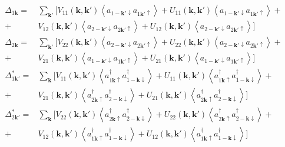\documentclass[class=article, crop=false]{standalone}
\begin{document}
\begin{equation}\label{key}
	\begin{split}
		\Delta_{ 1 \mathbf{k}} = & \sum_{ \mathbf{k}'} [ V_{ 1 1} ( \mathbf{k}, \mathbf{k}') \left\langle a_{ 1 -\mathbf{k}' \downarrow} a_{ 1 \mathbf{k}' \uparrow} \right\rangle + U_{ 1 1} ( \mathbf{k}, \mathbf{k}') \left\langle a_{ 1 -\mathbf{k}' \downarrow} a_{ 1 \mathbf{k}' \uparrow} \right\rangle + \\
		+ & V_{ 1 2} ( \mathbf{k}, \mathbf{k}') \left\langle a_{ 2 -\mathbf{k}' \downarrow} a_{ 2 \mathbf{k}' \uparrow} \right\rangle + U_{ 1 2} ( \mathbf{k}, \mathbf{k}') \left\langle a_{ 2 -\mathbf{k}' \downarrow} a_{ 2 \mathbf{k}' \uparrow} \right\rangle ]\\
		\Delta_{ 2 \mathbf{k}} = & \sum_{ \mathbf{k}'} [ V_{ 2 2} ( \mathbf{k}, \mathbf{k}') \left\langle a_{ 2 -\mathbf{k}' \downarrow} a_{ 2 \mathbf{k}' \uparrow} \right\rangle  + U_{ 2 2} ( \mathbf{k}, \mathbf{k}') \left\langle a_{ 2 -\mathbf{k}' \downarrow} a_{ 2 \mathbf{k}' \uparrow} \right\rangle + \\
		+ & V_{ 2 1} ( \mathbf{k}, \mathbf{k}') \left\langle a_{ 1 -\mathbf{k}' \downarrow} a_{ 1 \mathbf{k}' \uparrow} \right\rangle + U_{ 2 1} ( \mathbf{k}, \mathbf{k}') \left\langle a_{ 1 -\mathbf{k}' \downarrow} a_{ 1 \mathbf{k}' \uparrow} \right\rangle ] \\
		\Delta_{ 1 \mathbf{k}'}^{ \ast} = & \sum_{ \mathbf{k}} [ V_{ 1 1} ( \mathbf{k}, \mathbf{k}') \left\langle a^{ \dagger}_{ 1 \mathbf{k} \uparrow} a^{ \dagger}_{ 1 -\mathbf{k} \downarrow} \right\rangle + U_{ 1 1} ( \mathbf{k}, \mathbf{k}') \left\langle a^{ \dagger}_{ 1 \mathbf{k} \uparrow} a^{ \dagger}_{ 1 -\mathbf{k} \downarrow} \right\rangle + \\
		+ & V_{ 2 1} ( \mathbf{k}, \mathbf{k}') \left\langle a^{ \dagger}_{ 2 \mathbf{k} \uparrow} a^{ \dagger}_{ 2 -\mathbf{k} \downarrow} \right\rangle + U_{ 2 1} ( \mathbf{k}, \mathbf{k}') \left\langle a^{ \dagger}_{ 2 \mathbf{k} \uparrow} a^{ \dagger}_{ 2 -\mathbf{k} \downarrow} \right\rangle ] \\
		\Delta_{ 2 \mathbf{k}'}^{ \ast} = & \sum_{ \mathbf{k}} [ V_{ 2 2} ( \mathbf{k}, \mathbf{k}') \left\langle a^{ \dagger}_{ 2 \mathbf{k} \uparrow} a^{ \dagger}_{ 2 -\mathbf{k} \downarrow} \right\rangle + U_{ 2 2} ( \mathbf{k}, \mathbf{k}') \left\langle a^{ \dagger}_{ 2 \mathbf{k} \uparrow} a^{ \dagger}_{ 2 -\mathbf{k} \downarrow} \right\rangle + \\
		+ & V_{ 1 2} ( \mathbf{k}, \mathbf{k}') \left\langle a^{ \dagger}_{ 1 \mathbf{k} \uparrow} a^{ \dagger}_{ 1 -\mathbf{k} \downarrow} \right\rangle + U_{ 1 2} ( \mathbf{k}, \mathbf{k}') \left\langle a^{ \dagger}_{ 1 \mathbf{k} \uparrow} a^{ \dagger}_{ 1 -\mathbf{k} \downarrow} \right\rangle ]
	\end{split}
\end{equation}
\end{document}
